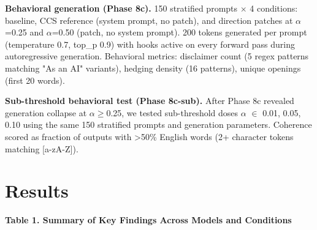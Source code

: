 \documentclass[11pt]{article}
\begin{document}
\textbf{Behavioral generation (Phase 8c).} 150 stratified prompts $\times$ 4 conditions: baseline, CCS reference (system prompt, no patch), and direction patches at $\alpha$=0.25 and $\alpha$=0.50 (patch, no system prompt). 200 tokens generated per prompt (temperature 0.7, top\_p 0.9) with hooks active on every forward pass during autoregressive generation. Behavioral metrics: disclaimer count (5 regex patterns matching "As an AI" variants), hedging density (16 patterns), unique openings (first 20 words).

\textbf{Sub-threshold behavioral test (Phase 8c-sub).} After Phase 8c revealed generation collapse at $\alpha$$\geq$0.25, we tested sub-threshold doses $\alpha$ $\in$ {0.01, 0.05, 0.10} using the same 150 stratified prompts and generation parameters. Coherence scored as fraction of outputs with >50\% English words (2+ character tokens matching [a-zA-Z]).

\section{Results}

\textbf{Table 1. Summary of Key Findings Across Models and Conditions}
\end{document}
